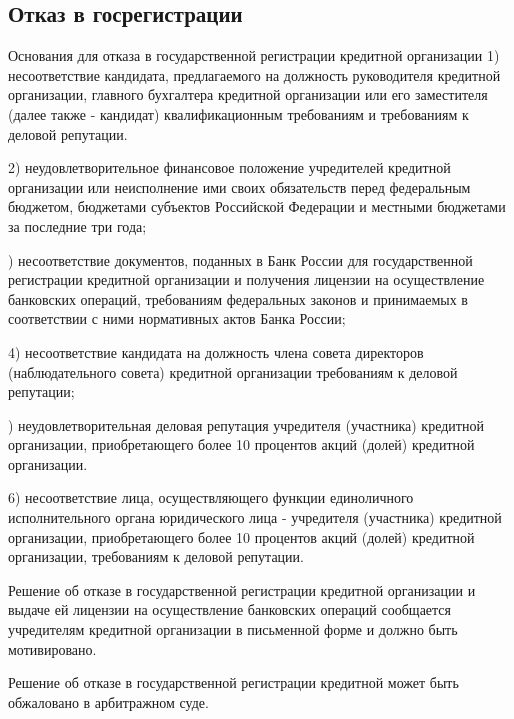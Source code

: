 \documentclass[_Banking_p1.tex]{subfiles}
\begin{document}
\subsection{Отказ в госрегистрации}
\begin{frame}[allowframebreaks]{\setfontsize{14pt} Основания для отказа в государственной регистрации кредитной организации}
1) несоответствие кандидата, предлагаемого на должность руководителя кредитной организации, главного бухгалтера кредитной организации или его заместителя (далее также - кандидат) квалификационным требованиям и требованиям к деловой репутации.

2) неудовлетворительное финансовое положение учредителей кредитной организации или неисполнение ими своих обязательств перед федеральным бюджетом, бюджетами субъектов Российской Федерации и местными бюджетами за последние три года;

) несоответствие документов, поданных в Банк России для государственной регистрации кредитной организации и получения лицензии на осуществление банковских операций, требованиям федеральных законов и принимаемых в соответствии с ними нормативных актов Банка России;

4) несоответствие кандидата на должность члена совета директоров (наблюдательного совета) кредитной организации требованиям к деловой репутации;

) неудовлетворительная деловая репутация учредителя (участника) кредитной организации, приобретающего более 10 процентов акций (долей) кредитной организации. 

6) несоответствие лица, осуществляющего функции единоличного исполнительного органа юридического лица - учредителя (участника) кредитной организации, приобретающего более 10 процентов акций (долей) кредитной организации, требованиям к деловой репутации.

\pagebreak
Решение об отказе в государственной регистрации кредитной организации и выдаче ей лицензии на осуществление банковских операций сообщается учредителям кредитной организации в письменной форме и должно быть мотивировано.

Решение об отказе в государственной регистрации кредитной может быть обжаловано в арбитражном суде. 

\end{frame}
\end{document}
